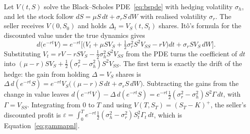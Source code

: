 Let $V(t,S)$ solve the Black--Scholes PDE~\eqref{eq:bspde} with hedging volatility $\sigma_h$, and let the stock follow $dS=\mu S\,dt+\sigma_rS\,dW$ with realised volatility $\sigma_r$.
The seller receives $V(0,S_0)$ and holds $\Delta_t=V_S(t,S_t)$ shares.
It\^o's formula for the discounted value under the true dynamics gives
\begin{equation}
d\big(e^{-rt}V\big)=e^{-rt}\Big[\big(V_t+\mu SV_S+\tfrac12\sigma_r^2S^2V_{SS}-rV\big)dt+\sigma_rSV_S\,dW\Big].
\end{equation}
Substituting $V_t=rV-rSV_S-\tfrac12\sigma_h^2S^2V_{SS}$ from the PDE turns the coefficient of $dt$ into $(\mu-r)SV_S+\tfrac12(\sigma_r^2-\sigma_h^2)S^2V_{SS}$.
The first term is exactly the drift of the hedge: the gain from holding $\Delta=V_S$ shares is $\Delta\,d(e^{-rt}S)=e^{-rt}V_S\big((\mu-r)S\,dt+\sigma_rS\,dW\big)$.
Subtracting the gains from the change in value leaves $d(e^{-rt}V)-\Delta\,d(e^{-rt}S)=e^{-rt}\tfrac12(\sigma_r^2-\sigma_h^2)S^2\Gamma\,dt$, with $\Gamma=V_{SS}$.
Integrating from $0$ to $T$ and using $V(T,S_T)=(S_T-K)^+$, the seller's discounted profit is $\varepsilon=\int_0^Te^{-rt}\tfrac12(\sigma_h^2-\sigma_r^2)S_t^2\Gamma_t\,dt$, which is Equation~\eqref{eq:gammapnl}.
